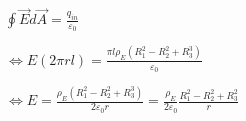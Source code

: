 \begin{enumerate}[(a)]
\begin{description}[labelwidth=1.5cm, leftmargin=!]
                            \vspace{0.3cm}
                            
                            $ \oint{\vec{E} d\vec{A}} = \frac{q_{in}}{\varepsilon_0} $
                            
                            \hspace{-0.57cm} $ \Leftrightarrow 
                            E (2 \pi r l) = \frac{\pi l \rho_E (R_1^2 - R_2^2 + R_3^3)}{\varepsilon_0} $
                            
                            \hspace{-0.57cm} $ \Leftrightarrow 
                            E = \frac{\rho_E (R_1^2 - R_2^2 + R_3^3)}{2 \varepsilon_0 r} 
                            = \frac{\rho_E}{2 \varepsilon_0} \frac{R_1^2 - R_2^2 + R_3^2}{r} $
        \end{description}
\end{enumerate}

\vspace{1cm}